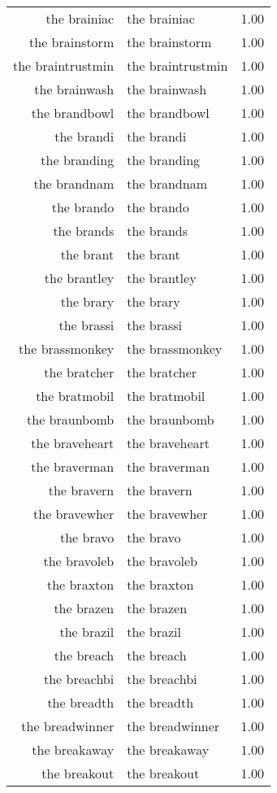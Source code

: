 \begin{table}[ht]
\begin{tabular}{rlr}
  the brainiac & the brainiac & 1.00 \\ 
  the brainstorm & the brainstorm & 1.00 \\ 
  the braintrustmin & the braintrustmin & 1.00 \\ 
  the brainwash & the brainwash & 1.00 \\ 
  the brandbowl & the brandbowl & 1.00 \\ 
  the brandi & the brandi & 1.00 \\ 
  the branding & the branding & 1.00 \\ 
  the brandnam & the brandnam & 1.00 \\ 
  the brando & the brando & 1.00 \\ 
  the brands & the brands & 1.00 \\ 
  the brant & the brant & 1.00 \\ 
  the brantley & the brantley & 1.00 \\ 
  the brary & the brary & 1.00 \\ 
  the brassi & the brassi & 1.00 \\ 
  the brassmonkey & the brassmonkey & 1.00 \\ 
  the bratcher & the bratcher & 1.00 \\ 
  the bratmobil & the bratmobil & 1.00 \\ 
  the braunbomb & the braunbomb & 1.00 \\ 
  the braveheart & the braveheart & 1.00 \\ 
  the braverman & the braverman & 1.00 \\ 
  the bravern & the bravern & 1.00 \\ 
  the bravewher & the bravewher & 1.00 \\ 
  the bravo & the bravo & 1.00 \\ 
  the bravoleb & the bravoleb & 1.00 \\ 
  the braxton & the braxton & 1.00 \\ 
  the brazen & the brazen & 1.00 \\ 
  the brazil & the brazil & 1.00 \\ 
  the breach & the breach & 1.00 \\ 
  the breachbi & the breachbi & 1.00 \\ 
  the breadth & the breadth & 1.00 \\ 
  the breadwinner & the breadwinner & 1.00 \\ 
  the breakaway & the breakaway & 1.00 \\ 
  the breakout & the breakout & 1.00 \\ 

\end{tabular}
\end{table}
